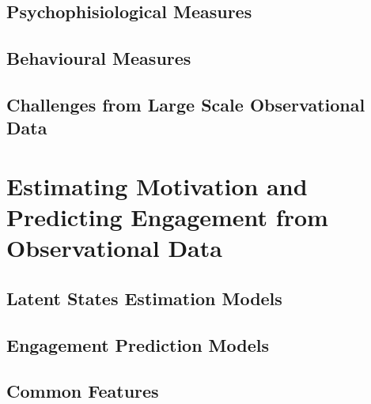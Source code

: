     \subsection{Psychophisiological Measures}
    \label{psychophisio}
    \lorem
    \subsection{Behavioural Measures}
    \label{behavioural_indices}
    \lorem
    \subsection{Challenges from Large Scale Observational Data}
    \label{challenges_large_scale}
    \lorem

\section{Estimating Motivation and Predicting Engagement from Observational Data}
\label{estpred_motivation_engagement}
\lorem
    \subsection{Latent States Estimation Models}
    \label{latent_estimation}
    \lorem
    \subsection{Engagement Prediction Models}
    \label{engagement_prediction}
    \lorem
    \subsection{Common Features}
    \label{estimation_prediction}
    \lorem

\lorem


